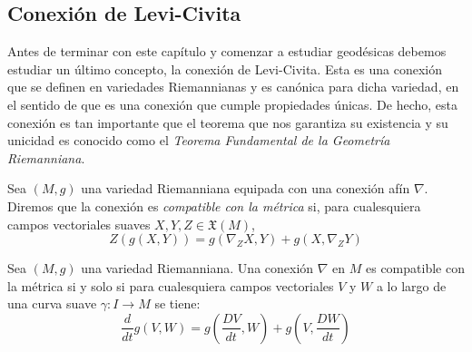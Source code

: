 \subsection{Conexión de Levi-Civita}
\label{Subsección: Conexión de Levi-Civita}
Antes de terminar con este capítulo y comenzar a estudiar geodésicas debemos estudiar un último concepto, la conexión de Levi-Civita. Esta es una conexión que se definen en variedades Riemannianas y es canónica para dicha variedad, en el sentido de que es una conexión que cumple propiedades únicas. De hecho, esta conexión es tan importante que el teorema que nos garantiza su existencia y su unicidad es conocido como el \textit{Teorema Fundamental de la Geometría Riemanniana}.

\begin{definition}
	Sea $(M,g)$ una variedad Riemanniana equipada con una conexión afín $\nabla$. Diremos que la conexión es \textit{compatible con la métrica} si, para cualesquiera campos vectoriales suaves $X,Y,Z \in \mathfrak{X}(M)$,
	\[
		Z(g(X,Y)) = g(\nabla_{Z}X, Y) + g(X,\nabla_{Z}Y)
	\]
\end{definition}

\begin{lemma}
	Sea $(M,g)$ una variedad Riemanniana. Una conexión $\nabla$ en $M$ es compatible con la métrica si y solo si para cualesquiera campos vectoriales $V$ y $W$ a lo largo de una curva suave $\gamma: I \to M$ se tiene:
	\[
		\frac{d}{dt}g(V,W) = g\left(\frac{DV}{dt},W \right) +g\left(V, \frac{DW}{dt} \right)
	\]
\end{lemma}


